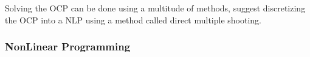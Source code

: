 Solving the \gls{OCP} can be done using a multitude of methods, \cite{breivik2017mpc} suggest discretizing 
the \gls{OCP} into a \gls{NLP} using a method called direct multiple shooting.


\subsubsection*{NonLinear Programming} \label{CHAP: NLP}
